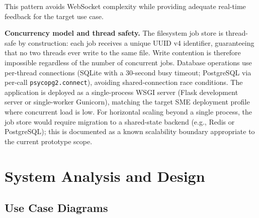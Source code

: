 \documentclass[11pt,a4paper]{report}
\begin{document}
This pattern avoids WebSocket complexity while providing adequate real-time feedback for the target use case.

\textbf{Concurrency model and thread safety.} The filesystem job store is thread-safe by construction: each job receives a unique UUID v4 identifier, guaranteeing that no two threads ever write to the same file. Write contention is therefore impossible regardless of the number of concurrent jobs. Database operations use per-thread connections (SQLite with a 30-second busy timeout; PostgreSQL via per-call \texttt{psycopg2.connect}), avoiding shared-connection race conditions. The application is deployed as a single-process WSGI server (Flask development server or single-worker Gunicorn), matching the target SME deployment profile where concurrent load is low. For horizontal scaling beyond a single process, the job store would require migration to a shared-state backend (e.g., Redis or PostgreSQL); this is documented as a known scalability boundary appropriate to the current prototype scope.

\chapter{System Analysis and Design}
\label{ch:analysis}

\section{Use Case Diagrams}
\label{sec:use-cases}
\end{document}
